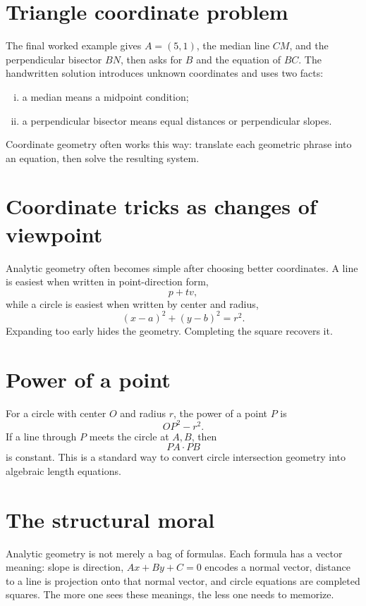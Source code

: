 \section{Triangle coordinate problem}

The final worked example gives \(A=(5,1)\), the median line \(CM\), and the perpendicular bisector \(BN\), then asks for \(B\) and the equation of \(BC\).  The handwritten solution introduces unknown coordinates and uses two facts:
\begin{enumerate}[(i)]
  \item a median means a midpoint condition;
  \item a perpendicular bisector means equal distances or perpendicular slopes.

\end{enumerate}
Coordinate geometry often works this way: translate each geometric phrase into an equation, then solve the resulting system.


\section{Coordinate tricks as changes of viewpoint}

Analytic geometry often becomes simple after choosing better coordinates.  A line is easiest when written in point-direction form,
\[
  p+tv,
\]
while a circle is easiest when written by center and radius,
\[
  (x-a)^2+(y-b)^2=r^2.
\]
Expanding too early hides the geometry.  Completing the square recovers it.

\section{Power of a point}

For a circle with center \(O\) and radius \(r\), the power of a point \(P\) is
\[
  OP^2-r^2.
\]
If a line through \(P\) meets the circle at \(A,B\), then
\[
  PA\cdot PB
\]
is constant.  This is a standard way to convert circle intersection geometry into algebraic length equations.

\section{The structural moral}

Analytic geometry is not merely a bag of formulas.  Each formula has a vector meaning: slope is direction, \(Ax+By+C=0\) encodes a normal vector, distance to a line is projection onto that normal vector, and circle equations are completed squares.  The more one sees these meanings, the less one needs to memorize.

